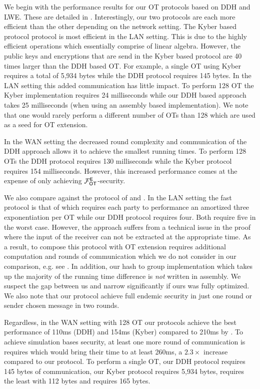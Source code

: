 We begin with the performance results for our OT protocols based on DDH and LWE. These are detailed in . Interestingly, our two protocols are each more efficient than the other depending on the network setting. The Kyber based protocol protocol is most efficient in the LAN setting. This is due to the highly efficient operations which essentially comprise of linear algebra. However, the public keys and encryptions that are send in the Kyber based protocol are 40 times larger than the DDH based OT. For example, a single OT using Kyber requires a total of 5,934 bytes while the DDH protocol requires 145 bytes. In the LAN setting this added communication has little impact. To perform 128 OT the Kyber implementation requires 24 milliseconds while our DDH based approach takes 25 milliseconds (when using an assembly based implementation). We note that one would rarely perform a different number of OTs than 128 which are used as a seed for OT extension.

In the WAN setting the decreased round complexity and communication of the DDH approach allows it to achieve the smallest running times. To perform 128 OTs the DDH protocol requires 130 milliseconds while the Kyber protocol requires 154 milliseconds. However, this increased performance comes at the expense of only achieving $\mathcal{F}_{\mathsf{OT}}^\mathsf{E}$-security. 

We also compare against the protocol of \cite{LC:ChoOrl15} and \cite{SODA:NaoPin01}. In the LAN setting the fast protocol is that of  \cite{LC:ChoOrl15} which requires each party to performance an amortized three exponentiation per OT while our DDH protocol requires four. Both require five in the worst case. However, the \cite{LC:ChoOrl15} approach suffers from a technical issue in the proof where the input of the receiver can not be extracted at the appropriate time. As a result, to compose this protocol with OT extension requires additional computation and rounds of communication which we do not consider in our comparison, e.g. see \cite[Appendix A]{SP:DKLS18}. In addition, our hash to group implementation which takes up the majority of the running time difference is \emph{not} written in assembly. We suspect the gap between us and \cite{LC:ChoOrl15} narrow significantly if ours was fully optimized. We also note that our protocol achieve full endemic security in just one round or sender chosen message in two rounds. 

Regardless, in the WAN setting with 128 OT our protocols achieve the best performance of 110ms (DDH) and 154ms (Kyber) compared to 210ms by  \cite{LC:ChoOrl15}. To achieve simulation bases security, at least one more round of communication is requires which would bring their time to at least 260ms, a $2.3\times$ increase compared to our protocol. To perform a single OT, our DDH protocol requires 145 bytes of communication, our Kyber protocol requires 5,934 bytes, \cite{LC:ChoOrl15} requires  the least with 112 bytes and \cite{SODA:NaoPin01} requires 165 bytes.


